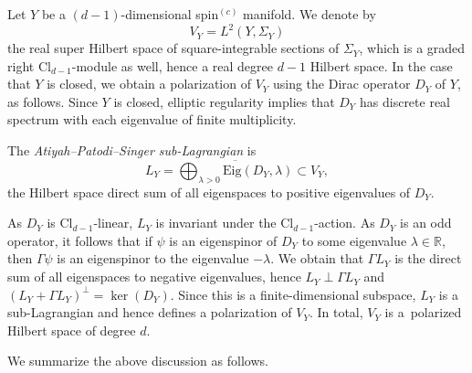 \documentclass[pdftex]{sigma}
\numberwithin{equation}{section}
\newcommand{\R}{\mathbb{R}}
\newcommand{\Cl}{\mathrm{Cl}}
\begin{document}
Let $Y$ be a $(d-1)$-dimensional spin$^{(c)}$ manifold.
We denote by
\begin{equation*}%
V_{Y} = L^2(Y, \Sigma_Y)
\end{equation*}
the real super Hilbert space of square-integrable sections of $\Sigma_Y$, which is a graded right $\Cl_{d-1}$-module as well, hence a real degree $d-1$ Hilbert space.
In the case that $Y$ is closed, we obtain a polarization of $V_Y$ using the Dirac operator $D_Y$ of $Y$, as follows.
Since $Y$ is closed, elliptic regularity implies that $D_Y$ has discrete real spectrum with each eigenvalue of finite multiplicity.

\begin{Definition}
\label{DefinitionAPSLagrangian}
The \emph{Atiyah--Patodi--Singer sub-Lagrangian} is
\begin{equation} \label{APSLagrangian}
 L_Y = \overline{\bigoplus_{\lambda > 0} \mathrm{Eig}(D_Y, \lambda)}\subset V_Y,
\end{equation}
the Hilbert space direct sum of all eigenspaces to positive eigenvalues of $D_Y$.
\end{Definition}

As $D_Y$ is $\Cl_{d-1}$-linear, $L_Y$ is invariant under the $\Cl_{d-1}$-action.
As $D_Y$ is an odd operator, it follows that if $\psi$ is an eigenspinor of $D_Y$ to some eigenvalue $\lambda \in \R$, then $\Gamma \psi$ is an eigenspinor to the eigenvalue $-\lambda$.
We obtain that $\Gamma L_Y$ is the direct sum of all eigenspaces to negative eigenvalues, hence $L_Y \perp \Gamma L_Y$ and $(L_Y + \Gamma L_Y)^\perp = \ker(D_Y)$.
Since this is a finite-dimensional subspace, $L_Y$ is a sub-Lagrangian and hence defines a polarization of $V_Y$.
In total, $V_Y$ is a~polarized Hilbert space of degree $d$.

We summarize the above discussion as follows.
\end{document}
